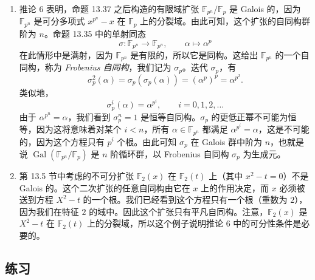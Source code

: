 \begin{enumerate}[label=(\arabic*)]
\item 推论 6 表明，命题 13.37 之后构造的有限域扩张 $\mathbb F_{p^n}/\mathbb F_p$ 是 Galois 的，因为 $\mathbb F_{p^n}$ 是可分多项式 $x^{p^n}-x$ 在 $\mathbb F_p$ 上的分裂域。由此可知，这个扩张的自同构群阶为 $n$。命题 13.35 中的单射同态
\[
\sigma:\mathbb F_{p^n}\longrightarrow \mathbb F_{p^n},\qquad \alpha\longmapsto \alpha^p
\]
在此情形中是满射，因为 $\mathbb F_{p^n}$ 是有限的，所以它是同构。这给出 $\mathbb F_{p^n}$ 的一个自同构，称为 \emph{Frobenius 自同构}，我们记为 $\sigma_p$。迭代 $\sigma_p$，有
\[
\sigma_p^2(\alpha)=\sigma_p(\sigma_p(\alpha))=(\alpha^p)^p=\alpha^{p^2}.
\]
类似地，
\[
\sigma_p^i(\alpha)=\alpha^{p^i},\qquad i=0,1,2,\ldots
\]
由于 $\alpha^{p^n}=\alpha$，我们看到 $\sigma_p^n=1$ 是恒等自同构。$\sigma_p$ 的更低正幂不可能为恒等，因为这将意味着对某个 $i<n$，所有 $\alpha\in\mathbb F_{p^n}$ 都满足 $\alpha^{p^i}=\alpha$，这是不可能的，因为这个方程只有 $p^i$ 个根。由此可知 $\sigma_p$ 在 Galois 群中阶为 $n$，也就是说 $\operatorname{Gal}(\mathbb F_{p^n}/\mathbb F_p)$ 是 $n$ 阶循环群，以 Frobenius 自同构 $\sigma_p$ 为生成元。

\item 第 13.5 节中考虑的不可分扩张 $\mathbb F_2(x)$ 在 $\mathbb F_2(t)$ 上（其中 $x^2-t=0$）不是 Galois 的。这个二次扩张的任意自同构由它在 $x$ 上的作用决定，而 $x$ 必须被送到方程 $X^2-t$ 的一个根。我们已经看到这个方程只有一个根（重数为 $2$），因为我们在特征 $2$ 的域中。因此这个扩张只有平凡自同构。注意，$\mathbb F_2(x)$ 是 $X^2-t$ 在 $\mathbb F_2(t)$ 上的分裂域，所以这个例子说明推论 6 中的可分性条件是必要的。
\end{enumerate}

\subsection*{练习}

